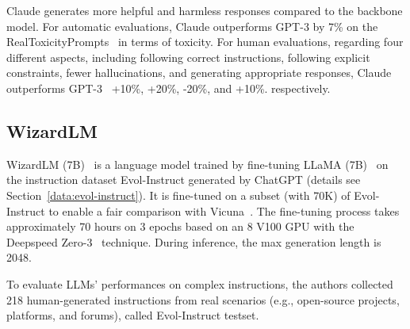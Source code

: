 \documentclass[11pt]{article}
\begin{document}
Claude generates more helpful and harmless responses compared to the backbone model. For automatic evaluations, Claude outperforms GPT-3 by 7\% on the RealToxicityPrompts~\citep{Gehman2020RealToxicityPromptsEN} in terms of toxicity. For human evaluations, regarding four different aspects, including following correct instructions, following explicit constraints, fewer hallucinations, and generating appropriate responses, Claude outperforms GPT-3~\citep{Brown2020LanguageMA} +10\%, +20\%, -20\%, and +10\%. respectively. 

\subsection{WizardLM}
WizardLM (7B)~\citep{xu2023wizardlm} is a language model trained by fine-tuning LLaMA (7B)~\citep{Touvron2023LLaMAOA} on the instruction dataset Evol-Instruct  generated by ChatGPT (details see Section~\ref{data:evol-instruct}).
It is
 fine-tuned on a subset (with 70K) of Evol-Instruct to enable a fair comparison with Vicuna~\citep{chiang2023vicuna}. The fine-tuning process takes approximately 70 hours on 3 epochs based on an 8 V100 GPU with the Deepspeed Zero-3~\citep{rasley2020deepspeed} technique. During inference, the max generation length is 2048.  

To evaluate LLMs' performances on complex instructions, the authors collected 218 human-generated instructions from real scenarios (e.g., open-source projects, platforms, and forums), called Evol-Instruct testset. 



\end{document}
